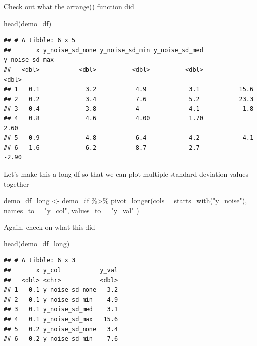 \documentclass[
]{book}
\newenvironment{Shaded}{\begin{snugshade}}{\end{snugshade}}
\newcommand{\AttributeTok}[1]{\textcolor[rgb]{0.77,0.63,0.00}{#1}}
\newcommand{\FunctionTok}[1]{\textcolor[rgb]{0.00,0.00,0.00}{#1}}
\newcommand{\NormalTok}[1]{#1}
\newcommand{\OtherTok}[1]{\textcolor[rgb]{0.56,0.35,0.01}{#1}}
\newcommand{\SpecialCharTok}[1]{\textcolor[rgb]{0.00,0.00,0.00}{#1}}
\newcommand{\StringTok}[1]{\textcolor[rgb]{0.31,0.60,0.02}{#1}}
\begin{document}
Check out what the arrange() function did

\begin{Shaded}
\begin{Highlighting}[]
\FunctionTok{head}\NormalTok{(demo\_df)}
\end{Highlighting}
\end{Shaded}

\begin{verbatim}
## # A tibble: 6 x 5
##       x y_noise_sd_none y_noise_sd_min y_noise_sd_med y_noise_sd_max
##   <dbl>           <dbl>          <dbl>          <dbl>          <dbl>
## 1   0.1             3.2           4.9            3.1           15.6 
## 2   0.2             3.4           7.6            5.2           23.3 
## 3   0.4             3.8           4              4.1           -1.8 
## 4   0.8             4.6           4.00           1.70           2.60
## 5   0.9             4.8           6.4            4.2           -4.1 
## 6   1.6             6.2           8.7            2.7           -2.90
\end{verbatim}

Let's make this a long df so that we can plot multiple standard deviation values together

\begin{Shaded}
\begin{Highlighting}[]
\NormalTok{demo\_df\_long }\OtherTok{\textless{}{-}}\NormalTok{ demo\_df }\SpecialCharTok{\%\textgreater{}\%} 
  \FunctionTok{pivot\_longer}\NormalTok{(}\AttributeTok{cols =} \FunctionTok{starts\_with}\NormalTok{(}\StringTok{"y\_noise"}\NormalTok{),}
               \AttributeTok{names\_to =} \StringTok{"y\_col"}\NormalTok{,}
               \AttributeTok{values\_to =} \StringTok{"y\_val"}
\NormalTok{  )}
\end{Highlighting}
\end{Shaded}

Again, check on what this did

\begin{Shaded}
\begin{Highlighting}[]
\FunctionTok{head}\NormalTok{(demo\_df\_long)}
\end{Highlighting}
\end{Shaded}

\begin{verbatim}
## # A tibble: 6 x 3
##       x y_col           y_val
##   <dbl> <chr>           <dbl>
## 1   0.1 y_noise_sd_none   3.2
## 2   0.1 y_noise_sd_min    4.9
## 3   0.1 y_noise_sd_med    3.1
## 4   0.1 y_noise_sd_max   15.6
## 5   0.2 y_noise_sd_none   3.4
## 6   0.2 y_noise_sd_min    7.6
\end{verbatim}
\end{document}

